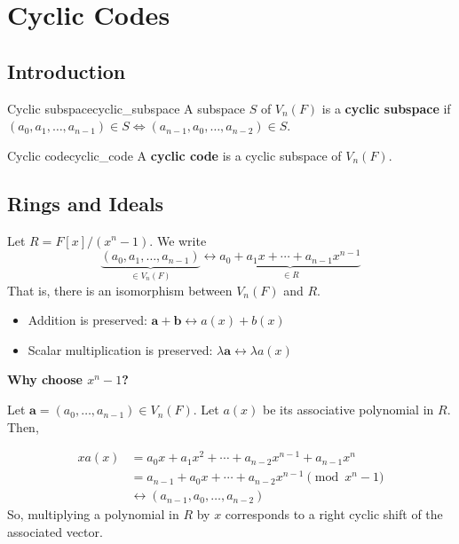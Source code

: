 \chapter{Cyclic Codes}
\section{Introduction}

\begin{Definition}{Cyclic subspace}{cyclic_subspace}
    A subspace $ S $ of $ V_n(F) $ is a \textbf{cyclic subspace}
    if $ (a_0,a_1,\ldots ,a_{n-1})\in S\iff
        (a_{n-1},a_0,\ldots , a_{n-2})\in S $.
\end{Definition}

\begin{Definition}{Cyclic code}{cyclic_code}
    A \textbf{cyclic code} is a cyclic subspace of $ V_n(F) $.
\end{Definition}

\section{Rings and Ideals}

Let $ R=F[x]/(x^n-1) $. We write
\[ \underbrace{(a_0,a_1,\ldots ,a_{n-1})}_{\in V_n(F)}
    \longleftrightarrow \underbrace{{a_0+a_1x+\cdots+a_{n-1}}x^{n-1}}_{\in R} \]
That is, there is an isomorphism between $ V_n(F) $ and $ R $.
\begin{itemize}
    \item Addition is preserved: $ \bm{a}+\bm{b}\longleftrightarrow a(x)+b(x) $
    \item Scalar multiplication is preserved: $ \lambda\bm{a} \longleftrightarrow \lambda a(x) $
\end{itemize}
\textbf{Why choose $ x^n -1$?}

Let $ \bm{a}=(a_0,\ldots ,a_{n-1})\in V_n(F) $. Let $ a(x) $ be its associative
polynomial in $ R $. Then,

\begin{align*}
    x a(x)
     & =a_0x+a_1x^2+\cdots+a_{n-2}x^{n-1}+a_{n-1}x^n     \\
     & =a_{n-1}+a_0x+\cdots+a_{n-2}x^{n-1} \pmod{x^n -1} \\
     & \longleftrightarrow (a_{n-1},a_0,\ldots ,a_{n-2})
\end{align*}
So, multiplying a polynomial in $ R $ by $ x $ corresponds
to a right cyclic shift of the associated vector.

